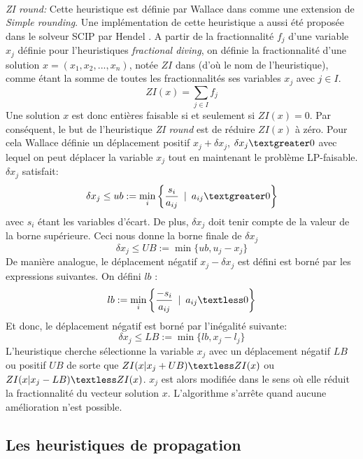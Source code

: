 \documentclass[12pt,a4paper,oneside]{book}
\theoremstyle{definition}
\DeclareMathOperator*{\mini}{min}
\begin{document}
	\paragraph{}
	\textit{ZI round:} Cette heuristique est définie par Wallace dans \cite{Wallace2009} comme une extension de \textit{Simple rounding}. Une implémentation de cette heuristique a aussi été proposée dans le solveur SCIP par Hendel \cite{Hendel2011}. 
	A partir de la fractionnalité $f_j$ d'une variable $x_j$ définie pour l'heuristiques \textit{fractional diving}, on définie la fractionnalité d'une solution $x = (x_1, x_2, ..., x_n)$, notée $ZI$ dans \cite{Wallace2009} (d'où le nom de l'heuristique), comme étant la somme de toutes les fractionnalités ses variables $x_j$ avec $j \in I$.
	\[
		ZI(x) = \sum_{j \in I} f_j
	\]
	Une solution $x$ est donc entières faisable si et seulement si $ZI(x) = 0$. Par conséquent, le but de l'heuristique \textit{ZI round} est de réduire $ZI(x)$ à zéro.
	Pour cela Wallace définie un déplacement positif  $x_j + \delta x_j$, $\delta x_j \textgreater 0$ avec lequel on peut déplacer la variable $x_j$ tout en maintenant le problème LP-faisable. $\delta x_j$ satisfait:
	\[
		\delta x_j \leq ub := \mini_{i} \bigg\{\frac{s_i}{a_{ij}} \hspace{5pt} | \hspace{5pt} a_{ij} \textgreater 0 \bigg\}
	\]
	avec $s_i$ étant les variables d'écart. 
	De plus, $\delta x_j $ doit tenir compte de la valeur de la borne supérieure. Ceci nous donne la borne finale de $\delta x_j$
	\[
		\delta x_j \leq UB := \min\{ub,u_j - x_j\}
	\]
	De manière analogue, le déplacement négatif $x_j - \delta x_j $ est défini est borné par les expressions suivantes.
	On défini $lb$ :
	\[
		lb := \mini_{i} \bigg\{\frac{- s_i}{a_{ij}} \hspace{5pt} | \hspace{5pt} a_{ij} \textless 0 \bigg\}
	\]
	Et donc, le déplacement négatif est borné par l'inégalité suivante:
	\[
		\delta x_j \leq LB := \min\{lb,x_j - l_j\}
	\]
	L'heuristique cherche sélectionne la variable $x_j$ avec un déplacement négatif $LB$ ou positif $UB$ de sorte que $ZI(x | x_j + UB) \textless ZI(x)  $  ou $ZI(x | x_j - LB) \textless ZI(x)$. $x_j$ est alors modifiée dans le sens où elle réduit la fractionnalité du vecteur solution $x$. L'algorithme s'arrête quand aucune amélioration n'est possible. 
	
	\subsection{Les heuristiques de propagation}
\end{document}
